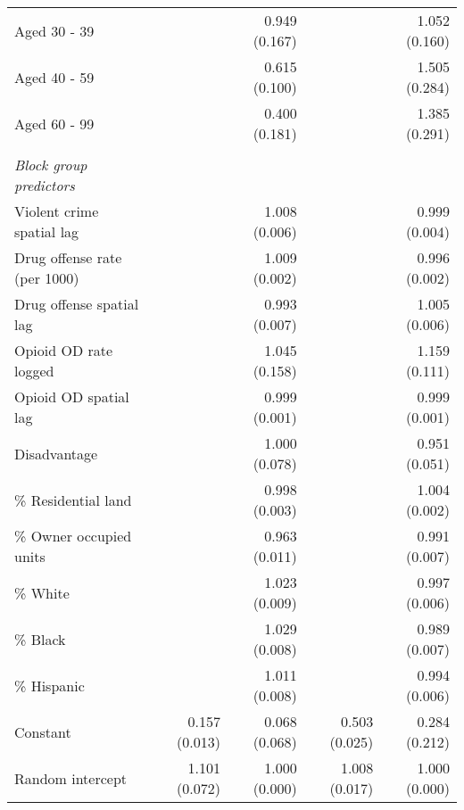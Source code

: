 \begin{table}[htbp]
\begin{adjustbox}{max width=\linewidth}
\begin{tabular}{l*{4}{D{.}{.}{-1}}}
Aged 30 - 39    &                 &0.949 (0.167)        &                 &1.052 (0.160)        \\
Aged 40 - 59    &                 &0.615\sym{**} (0.100)        &                 &1.505\sym{*} (0.284)        \\
Aged 60 - 99    &                 &0.400\sym{*} (0.181)        &                 &1.385 (0.291)        \\
\vspace{.05em} \\
\emph{Block group predictors}&                 &                 &                 &                 \\
Violent crime spatial lag&                 &1.008 (0.006)        &                 &0.999 (0.004)        \\
Drug offense rate (per 1000)&                 &1.009\sym{**} (0.002)        &                 &0.996\sym{*} (0.002)        \\
Drug offense spatial lag&                 &0.993 (0.007)        &                 &1.005 (0.006)        \\
Opioid OD rate logged&                 &1.045 (0.158)        &                 &1.159 (0.111)        \\
Opioid OD spatial lag&                 &0.999 (0.001)        &                 &0.999\sym{*} (0.001)        \\
Disadvantage&                 &1.000 (0.078)        &                 &0.951 (0.051)        \\
\% Residential land&                 &0.998 (0.003)        &                 &1.004\sym{*} (0.002)        \\
\% Owner occupied units&                 &0.963\sym{**} (0.011)        &                 &0.991 (0.007)        \\
\% White        &                 &1.023\sym{**} (0.009)        &                 &0.997 (0.006)        \\
\% Black        &                 &1.029\sym{**} (0.008)        &                 &0.989 (0.007)        \\
\% Hispanic     &                 &1.011 (0.008)        &                 &0.994 (0.006)        \\
Constant        &0.157\sym{**} (0.013)        &0.068\sym{**} (0.068)        &0.503\sym{**} (0.025)        &0.284 (0.212)        \\
\midrule
Random intercept&1.101 (0.072)        &1.000 (0.000)        &1.008 (0.017)        &1.000 (0.000)        \\

\end{tabular}
\end{adjustbox}
\end{table}
